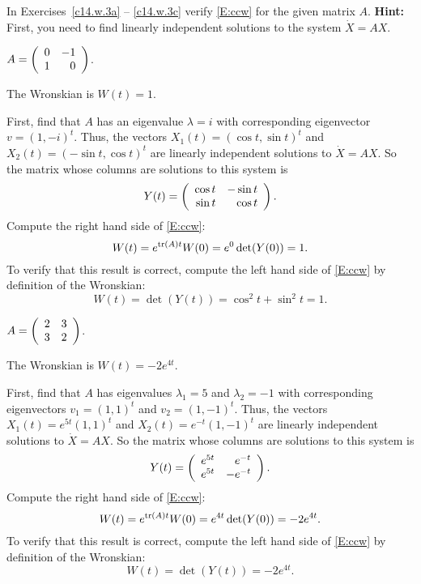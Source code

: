 \documentclass{ximera}
\begin{document}
\noindent In Exercises~\ref{c14.w.3a} -- \ref{c14.w.3c} verify \eqref{E:ccw} 
for the given matrix $A$.  {\bf Hint:} First, you need to find linearly 
independent solutions to the system $\dot{X}=AX$.
\begin{exercise} 	\label{c14.w.3a}
$A = \left(\begin{array}{rr} 0 & -1\\ 1 &0\end{array}\right)$.

\begin{solution}
\ans The Wronskian is $W(t) = 1$.

\soln First, find that $A$ has an eigenvalue $\lambda = i$ with corresponding
eigenvector $v = (1,-i)^t$.  Thus, the vectors $X_1(t) = (\cos t, \sin t)^t$
and $X_2(t) = (-\sin t, \cos t)^t$ are linearly independent solutions to
$\dot{X} = AX$.  So the matrix whose columns are solutions to this system
is
\[
Y(t) = \left(\begin{array}{rr} \cos t & -\sin t\\ \sin t &\cos t\end{array}\right).
\]
Compute the right hand side of \eqref{E:ccw}:
\[
W(t) = e^{{\rm tr}(A)t}W(0) = e^0\det(Y(0)) = 1.
\]
To verify that this result is correct, compute the left hand side of
\eqref{E:ccw} by definition of the Wronskian:
\[
W(t) = \det(Y(t)) = \cos^2 t + \sin^2 t = 1.
\]

\end{solution}
\end{exercise}
\begin{exercise} 	\label{c14.w.3b}
$A = \left(\begin{array}{rr} 2 & 3\\ 3 &2\end{array}\right)$.

\begin{solution}
\ans The Wronskian is $W(t) = -2e^{4t}$.

\soln First, find that $A$ has eigenvalues $\lambda_1 = 5$ and
$\lambda_2 = -1$ with corresponding eigenvectors $v_1 = (1,1)^t$ and
$v_2 = (1,-1)^t$.  Thus, the vectors $X_1(t) = e^{5t}(1,1)^t$ and
$X_2(t) = e^{-t}(1,-1)^t$ are linearly independent solutions to
$\dot{X} = AX$.  So the matrix whose columns are solutions to this
system is
\[
Y(t) = \left(\begin{array}{rr} e^{5t} & e^{-t}\\ e^{5t} &-e^{-t}\end{array}\right).
\]
Compute the right hand side of \eqref{E:ccw}:
\[
W(t) = e^{{\rm tr}(A)t}W(0) = e^{4t}\det(Y(0)) = -2e^{4t}.
\]
To verify that this result is correct, compute the left hand side of
\eqref{E:ccw} by definition of the Wronskian:
\[
W(t) = \det(Y(t)) = -2e^{4t}.
\]

\end{solution}
\end{exercise}
\end{document}
